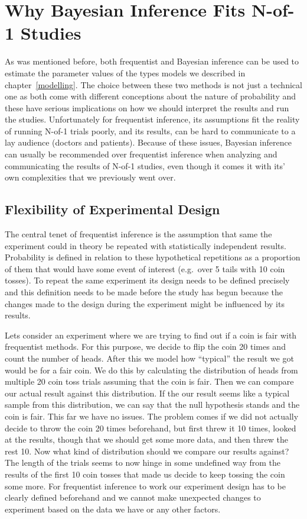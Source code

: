 \documentclass[12pt,a4paper,leqno]{report}
\theoremstyle{plain}
\theoremstyle{definition}
\theoremstyle{remark}
\begin{document}
\section{Why Bayesian Inference Fits N-of-1 Studies}\label{whybayes}

As was mentioned before, both frequentist and Bayesian inference can be used to
estimate the parameter values of the types models we described
in chapter\ \ref{modelling}. The choice between these two methods is not just a
technical one as both come with different conceptions about the nature of probability
and these have serious implications on how we should interpret the results and run the studies.
Unfortunately for frequentist inference, its assumptions fit the reality of running
N-of-1 trials poorly, and its results, can be hard to communicate to a lay
audience (doctors and patients). Because of these issues, Bayesian inference
can usually be recommended over frequentist inference when analyzing and
communicating the results of N-of-1 studies, even though it comes it with its'
own complexities that we previously went over.

\subsection{Flexibility of Experimental Design}\label{whybayes}

The central tenet of frequentist inference is the assumption that same the
experiment could in theory be repeated with statistically independent results. Probability
is defined in relation to these hypothetical repetitions as a proportion of them
that would have some event of interest (e.g.\ over 5 tails with 10 coin tosses).
To repeat the same experiment its design needs to be defined precisely and this
definition needs to be made before the study has begun because the changes made
to the design during the experiment might be influenced by its results.

Lets consider an experiment where we are trying to find out if a coin
is fair with frequentist methods. For this purpose, we decide to flip the coin 20 times
and count the number of heads. After this we model how ``typical'' the result we got
would be for a fair coin. We do this by calculating the distribution of heads from
multiple 20 coin toss trials
assuming that the coin is fair. Then we can compare our actual result against this
distribution. If the our result seems like a typical sample from this distribution, we
can say that the null hypothesis stands and the coin is fair. This far we have no
issues. The problem comes if we did not actually decide to throw the coin 20 times
beforehand, but first threw it 10 times, looked at the results, though that we
should get some more data, and then threw the rest 10. Now what
kind of distribution should we compare our results against? The length of the trials
seems to now hinge in some undefined way from the results of the first 10 coin tosses
that made us decide to keep tossing the coin some more. For frequentist inference to
work our experiment design has to be clearly defined beforehand and we cannot make
unexpected changes to experiment based on the data we have or any other factors.
\end{document}
